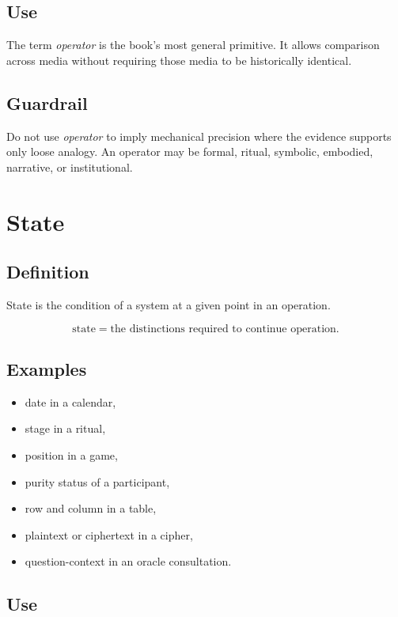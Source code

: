 \documentclass[11pt]{book}
\begin{document}
\subsection*{Use}

The term \emph{operator} is the book's most general primitive. It allows comparison across media without requiring those media to be historically identical.

\subsection*{Guardrail}

Do not use \emph{operator} to imply mechanical precision where the evidence supports only loose analogy. An operator may be formal, ritual, symbolic, embodied, narrative, or institutional.

\section{State}

\subsection*{Definition}

State is the condition of a system at a given point in an operation.

\[
\text{state} = \text{the distinctions required to continue operation}.
\]

\subsection*{Examples}

\begin{itemize}
    \item date in a calendar,
    \item stage in a ritual,
    \item position in a game,
    \item purity status of a participant,
    \item row and column in a table,
    \item plaintext or ciphertext in a cipher,
    \item question-context in an oracle consultation.
\end{itemize}

\subsection*{Use}
\end{document}
